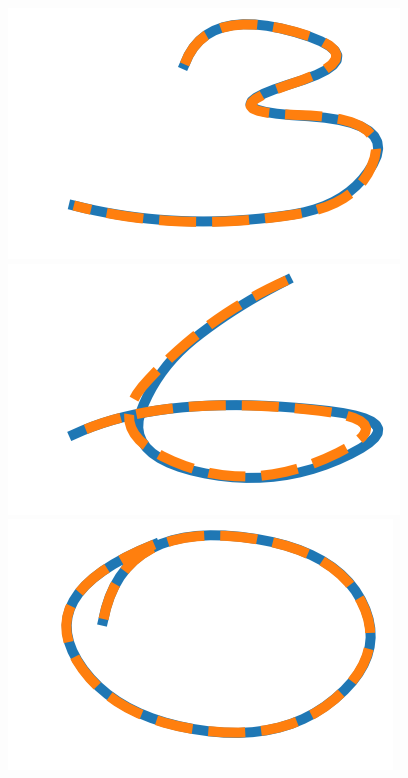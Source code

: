 \documentclass{article}
\theoremstyle{plain}
\theoremstyle{definition}
\begin{document}
\begin{figure}
\centering
\begin{minipage}{.2\textwidth}
  \centering
  \includegraphics[width=0.9\linewidth]{figures/3}
\end{minipage}
\begin{minipage}{.2\textwidth}
  \centering
  \includegraphics[width=0.9\linewidth]{figures/6}
\end{minipage}
\begin{minipage}{.2\textwidth}
  \centering
  \includegraphics[width=0.9\linewidth]{figures/0}

\end{minipage}
\end{figure}
\end{document}
